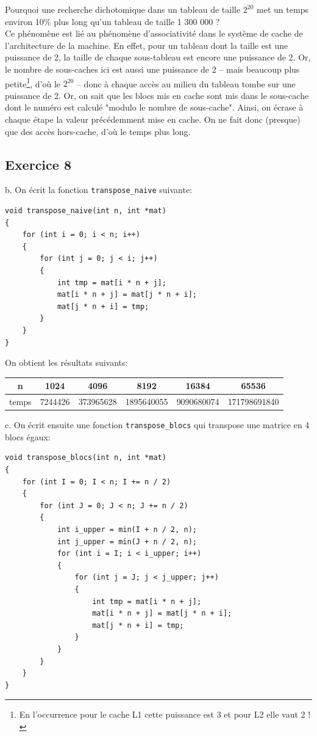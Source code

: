 \documentclass[11pt, a4 paper]{article}
\begin{document}
Pourquoi une recherche dichotomique dans un tableau de taille $2^{20}$ met un temps environ 10\% plus long qu'un tableau de taille 1 300 000 ?\\
Ce phénomène est lié au phénomène d'associativité dans le système de cache de l'architecture de la machine.
En effet, pour un tableau dont la taille est une puissance de 2, la taille de chaque sous-tableau est encore une puissance de 2.
Or, le nombre de sous-caches ici est aussi une puissance de 2 -- mais beaucoup plus petite\footnote{En l'occurrence pour le cache L1 cette puissance est 3 et pour L2 elle vaut 2 !}, d'où le $2^{20}$ -- donc à chaque accès au milieu du tableau tombe sur une puissance de 2.
Or, on sait que les blocs mis en cache sont mis dans le sous-cache dont le numéro est calculé "modulo le nombre de sous-cache".
Ainsi, on écrase à chaque étape la valeur précédemment mise en cache.
On ne fait donc (presque) que des accès hors-cache, d'où le temps plus long.

\subsection{Exercice 8}
b. On écrit la fonction \texttt{transpose\_naive} suivante:
\begin{lstlisting}[style=CStyle]
void transpose_naive(int n, int *mat)
{
    for (int i = 0; i < n; i++)
    {
        for (int j = 0; j < i; j++)
        {
            int tmp = mat[i * n + j];
            mat[i * n + j] = mat[j * n + i];
            mat[j * n + i] = tmp;
        }
    }
}
\end{lstlisting}

On obtient les résultats suivants:
\begin{center}
    \begin{tabular}{| c | c | c | c | c | c |}
        \hline
    n & 1024 & 4096 & 8192 & 16384 & 65536 \\
    \hline
    temps & 7244426 & 373965628 & 1895640055 & 9090680074 & 171798691840\\
    \hline
    \end{tabular}
\end{center}

c. On écrit ensuite une fonction \texttt{transpose\_blocs} qui transpose une matrice en 4 blocs égaux:
\begin{lstlisting}[style=CStyle]
void transpose_blocs(int n, int *mat)
{
    for (int I = 0; I < n; I += n / 2)
    {
        for (int J = 0; J < n; J += n / 2)
        {
            int i_upper = min(I + n / 2, n);
            int j_upper = min(J + n / 2, n);
            for (int i = I; i < i_upper; i++)
            {
                for (int j = J; j < j_upper; j++)
                {
                    int tmp = mat[i * n + j];
                    mat[i * n + j] = mat[j * n + i];
                    mat[j * n + i] = tmp;
                }
            }
        }
    }
}
\end{lstlisting}
\end{document}
